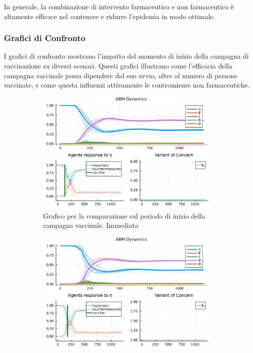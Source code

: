 In generale, la combinazione di intervento farmaceutico e non 
farmaceutico è altamente efficace nel contenere e ridurre 
l'epidemia in modo ottimale.

\subsubsection{Grafici di Confronto}

I grafici di confronto mostrano l'impatto del momento di inizio della 
campagna di vaccinazione su diversi scenari. Questi grafici illustrano 
come l'efficacia della campagna vaccinale possa dipendere dal suo avvio, 
oltre al numero di persone vaccinate, e come questa influenzi attivamente
le contromisure non farmaceutiche.

\begin{figure}[H]
	\centering
	\begin{subfigure}[b]{0.45\textwidth}
		\centering
		\includegraphics[width=\textwidth]{img/SocialNetworkABM_5_A.jpg}
		\caption{Grafico per la comparazione sul periodo di inizio della campagna vaccinale. Immediata}
		\label{fig:comparison_all_1}
	\end{subfigure}
	\hfill
	\begin{subfigure}[b]{0.45\textwidth}
		\centering
		\includegraphics[width=\textwidth]{img/SocialNetworkABM_1_A.jpg}

\end{subfigure}
\end{figure}
